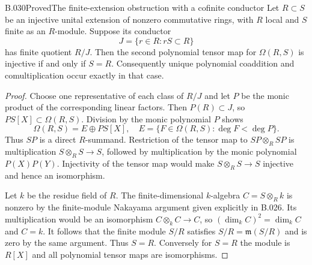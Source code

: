 \begin{saresult}{B.030}{Proved}{The finite-extension obstruction with a cofinite conductor}
Let $R\subset S$ be an injective unital extension of nonzero
commutative rings, with $R$ local and $S$ finite as an $R$-module.
Suppose its conductor
\[
 J=\{r\in R:rS\subset R\}
\]
has finite quotient $R/J$. Then the second polynomial tensor map
for $\Omega(R,S)$ is injective if and only if $S=R$.
Consequently unique polynomial coaddition and comultiplication
occur exactly in that case.
\end{saresult}
\begin{proof}
Choose one representative of each class of $R/J$ and let $P$ be
the monic product of the corresponding linear factors. Then
$P(R)\subset J$, so $PS[X]\subset\Omega(R,S)$.
Division by the monic polynomial $P$ shows
\[
 \Omega(R,S)=E\oplus PS[X],
 \quad E=\{F\in\Omega(R,S):\deg F<\deg P\}.
\]
Thus $SP$ is a direct $R$-summand. Restriction of the tensor map
to $SP\otimes_RSP$ is multiplication
$S\otimes_RS\to S$, followed by multiplication by the monic
polynomial $P(X)P(Y)$. Injectivity of the tensor map would make
$S\otimes_RS\to S$ injective and hence an isomorphism.

Let $k$ be the residue field of $R$. The finite-dimensional
$k$-algebra $C=S\otimes_Rk$ is nonzero by the finite-module
Nakayama argument given explicitly in B.026. Its multiplication
would be an isomorphism $C\otimes_kC\to C$, so
$(\dim_k C)^2=\dim_k C$ and $C=k$.
It follows that the finite module $S/R$ satisfies
$S/R=\mathfrak m(S/R)$ and is zero by the same argument.
Thus $S=R$. Conversely for $S=R$ the module is $R[X]$ and all
polynomial tensor maps are isomorphisms.
\end{proof}

